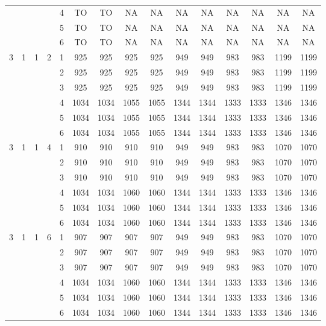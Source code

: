 \begin{longtable}{|c|c|c|c|c|c c|c c|c c|c c|c c|}
 & & & & 4 & TO & TO & NA & NA & NA & NA & NA & NA & NA & NA \\
 & & & & 5 & TO & TO & NA & NA & NA & NA & NA & NA & NA & NA \\
 & & & & 6 & TO & TO & NA & NA & NA & NA & NA & NA & NA & NA \\
\hline
\multirow{6}{*}{3} & \multirow{6}{*}{1} & \multirow{6}{*}{1} & \multirow{6}{*}{2} & 1 & 925 & 925 & 925 & 925 & 949 & 949 & 983 & 983 & 1199 & 1199 \\
 & & & & 2 & 925 & 925 & 925 & 925 & 949 & 949 & 983 & 983 & 1199 & 1199 \\
 & & & & 3 & 925 & 925 & 925 & 925 & 949 & 949 & 983 & 983 & 1199 & 1199 \\
 & & & & 4 & 1034 & 1034 & 1055 & 1055 & 1344 & 1344 & 1333 & 1333 & 1346 & 1346 \\
 & & & & 5 & 1034 & 1034 & 1055 & 1055 & 1344 & 1344 & 1333 & 1333 & 1346 & 1346 \\
 & & & & 6 & 1034 & 1034 & 1055 & 1055 & 1344 & 1344 & 1333 & 1333 & 1346 & 1346 \\
\hline
\multirow{6}{*}{3} & \multirow{6}{*}{1} & \multirow{6}{*}{1} & \multirow{6}{*}{4} & 1 & 910 & 910 & 910 & 910 & 949 & 949 & 983 & 983 & 1070 & 1070 \\
 & & & & 2 & 910 & 910 & 910 & 910 & 949 & 949 & 983 & 983 & 1070 & 1070 \\
 & & & & 3 & 910 & 910 & 910 & 910 & 949 & 949 & 983 & 983 & 1070 & 1070 \\
 & & & & 4 & 1034 & 1034 & 1060 & 1060 & 1344 & 1344 & 1333 & 1333 & 1346 & 1346 \\
 & & & & 5 & 1034 & 1034 & 1060 & 1060 & 1344 & 1344 & 1333 & 1333 & 1346 & 1346 \\
 & & & & 6 & 1034 & 1034 & 1060 & 1060 & 1344 & 1344 & 1333 & 1333 & 1346 & 1346 \\
\hline
\multirow{6}{*}{3} & \multirow{6}{*}{1} & \multirow{6}{*}{1} & \multirow{6}{*}{6} & 1 & 907 & 907 & 907 & 907 & 949 & 949 & 983 & 983 & 1070 & 1070 \\
 & & & & 2 & 907 & 907 & 907 & 907 & 949 & 949 & 983 & 983 & 1070 & 1070 \\
 & & & & 3 & 907 & 907 & 907 & 907 & 949 & 949 & 983 & 983 & 1070 & 1070 \\
 & & & & 4 & 1034 & 1034 & 1060 & 1060 & 1344 & 1344 & 1333 & 1333 & 1346 & 1346 \\
 & & & & 5 & 1034 & 1034 & 1060 & 1060 & 1344 & 1344 & 1333 & 1333 & 1346 & 1346 \\
 & & & & 6 & 1034 & 1034 & 1060 & 1060 & 1344 & 1344 & 1333 & 1333 & 1346 & 1346 \\

\end{longtable}
